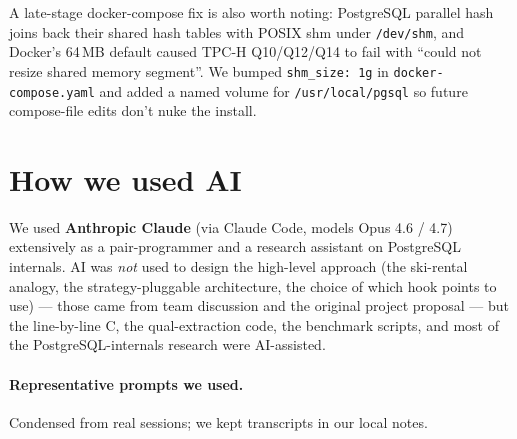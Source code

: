 \documentclass[10pt,a4paper]{article}
\newcommand{\code}[1]{\texttt{\small #1}}
\begin{document}
A late-stage docker-compose fix is also worth noting: PostgreSQL
parallel hash joins back their shared hash tables with POSIX shm
under \code{/dev/shm}, and Docker's 64\,MB default caused TPC-H
Q10/Q12/Q14 to fail with ``could not resize shared memory
segment''. We bumped \code{shm\_size:\,1g} in
\code{docker-compose.yaml} and added a named volume for
\code{/usr/local/pgsql} so future compose-file edits don't nuke the
install.

\section{How we used AI}

We used \textbf{Anthropic Claude} (via Claude Code, models Opus 4.6 /
4.7) extensively as a pair-programmer and a research assistant on
PostgreSQL internals. AI was \emph{not} used to design the high-level
approach (the ski-rental analogy, the strategy-pluggable architecture,
the choice of which hook points to use) --- those came from team
discussion and the original project proposal --- but the line-by-line
C, the qual-extraction code, the benchmark scripts, and most of the
PostgreSQL-internals research were AI-assisted.

\paragraph{Representative prompts we used.} Condensed from real
sessions; we kept transcripts in our local notes.
\end{document}
